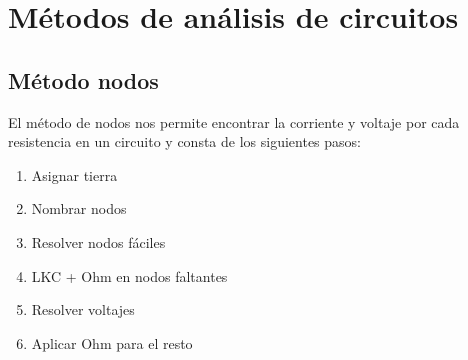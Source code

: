 





\section{Métodos de análisis de circuitos}

\subsection{Método nodos}
\justify
El método de nodos nos permite encontrar la corriente y voltaje por cada resistencia en un circuito y consta de los siguientes pasos:
\begin{enumerate}
    \item Asignar tierra
    \item Nombrar nodos
    \item Resolver nodos fáciles
    \item LKC + Ohm en nodos faltantes
    \item Resolver voltajes
    \item Aplicar Ohm para el resto
\end{enumerate}


